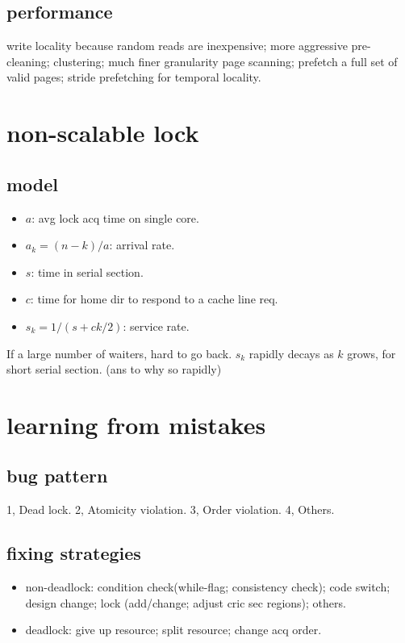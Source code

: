 \documentclass[9pt,conference]{IEEEtran}
\begin{document}
\subsection{performance}
\label{sec-2-2}
write locality because random reads are inexpensive;
more aggressive pre-cleaning; clustering;
much finer granularity page scanning;
prefetch a full set of valid pages;
stride prefetching for temporal locality.

\section{non-scalable lock}
\label{sec-3}
\subsection{model}
\label{sec-3-1}
\begin{itemize}
\item $a$: avg lock acq time on single core.
\item $a_k = (n - k) / a$: arrival rate.
\item $s$: time in serial section.
\item $c$: time for home dir to respond to a cache line req.
\item $s_k = 1 / (s + ck / 2)$: service rate.
\end{itemize}
If a large number of waiters, hard to go back.
$s_k$ rapidly decays as $k$ grows, for short serial section. (ans to why so rapidly)
\section{learning from mistakes}
\label{sec-4}
\subsection{bug pattern}
\label{sec-4-1}
1, Dead lock. 2, Atomicity violation. 3, Order violation. 4, Others.
\subsection{fixing strategies}
\label{sec-4-2}
\begin{itemize}
\item non-deadlock: condition check(while-flag; consistency check); code switch; design change; lock (add/change; adjust cric sec regions); others.
\item deadlock: give up resource; split resource; change acq order.
\end{itemize}
\end{document}
